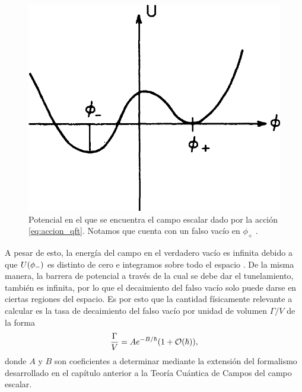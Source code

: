 \begin{figure}[t]
	\centering
	\includegraphics[scale=0.25]{FIGURAS/potencial_qft}
	\caption{Potencial en el que se encuentra el campo escalar dado por la acción \eqref{eq:accion_qft}. Notamos que cuenta con un falso vacío en $\phi_+$ \cite{callan1977fate}.}
	\label{fig:potencial_qft}
\end{figure}

A pesar de esto, la energía del campo en el verdadero vacío es infinita debido a que $U\qty(\phi_-)$ es distinto de cero e integramos sobre todo el espacio \cite{paranjape2017theory}. De la misma manera, la barrera de potencial a través de la cual se debe dar el tunelamiento, también es infinita, por lo que el decaimiento del falso vacío solo puede darse en ciertas regiones del espacio. 
Es por esto que la cantidad físicamente relevante a calcular es la tasa de decaimiento del falso vacío por unidad de volumen $\Gamma/V$ \cite{weinberg2012classical} de la forma
\begin{equation} \label{eq:gamma_volumen_WKB}
\frac{\Gamma}{V} = Ae^{-B/\hbar}\qty(1 + \order{\hbar}),
\end{equation}
donde $A$ y $B$ son coeficientes a determinar mediante la extensión del formalismo desarrollado en el capítulo anterior a la Teoría Cuántica de Campos del campo escalar. 



